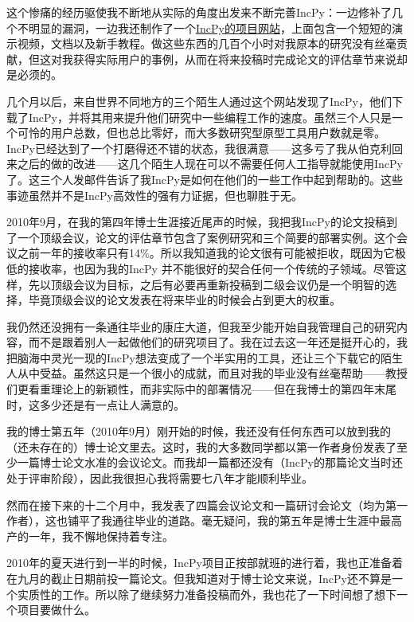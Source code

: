 \documentclass[12pt,UTF8,nofonts]{book}
\begin{document}
\breakline

这个惨痛的经历驱使我不断地从实际的角度出发来不断完善IncPy：一边修补了几个不明显的漏洞，一边我还制作了一个\href{http://www.pgbovine.net/incpy.html}{IncPy的项目网站}，上面包含一个短短的演示视频，文档以及新手教程。做这些东西的几百个小时对我原本的研究没有丝毫贡献，但这对我获得实际用户的事例，从而在将来投稿时完成论文的评估章节来说却是必须的。

几个月以后，来自世界不同地方的三个陌生人通过这个网站发现了IncPy，他们下载了IncPy，并将其用来提升他们研究中一些编程工作的速度。虽然三个人只是一个可怜的用户总数，但也总比零好，而大多数研究型原型工具用户数就是零。IncPy已经达到了一个打磨得还不错的状态，我很满意——这多亏了我从伯克利回来之后的做的改进——这几个陌生人现在可以不需要任何人工指导就能使用IncPy了。这三个人发邮件告诉了我IncPy是如何在他们的一些工作中起到帮助的。这些事迹虽然并不是IncPy高效性的强有力证据，但也聊胜于无。

2010年9月，在我的第四年博士生涯接近尾声的时候，我把我IncPy的论文投稿到了一个顶级会议，论文的评估章节包含了案例研究和三个简要的部署实例。这个会议之前一年的接收率只有14\%。所以我知道我的论文很有可能被拒收，既因为它极低的接收率，也因为我的IncPy 并不能很好的契合任何一个传统的子领域。尽管这样，先以顶级会议为目标，之后有必要再重新投稿到二级会议仍是一个明智的选择，毕竟顶级会议的论文发表在将来毕业的时候会占到更大的权重。

我仍然还没拥有一条通往毕业的康庄大道，但我至少能开始自我管理自己的研究内容，而不是跟着别人一起做他们的研究项目了。我在过去这一年还是挺开心的，我把脑海中灵光一现的IncPy想法变成了一个半实用的工具，还让三个下载它的陌生人从中受益。虽然这只是一个很小的成就，而且对我的毕业没有丝毫帮助——教授们更看重理论上的新颖性，而非实际中的部署情况——但在我博士的第四年末尾时，这多少还是有一点让人满意的。

我的博士第五年（2010年9月）刚开始的时候，我还没有任何东西可以放到我的（还未存在的）博士论文里去。这时，我的大多数同学都以第一作者身份发表了至少一篇博士论文水准的会议论文。而我却一篇都还没有（IncPy的那篇论文当时还处于评审阶段），因此我很担心我将需要七八年才能顺利毕业。

然而在接下来的十二个月中，我发表了四篇会议论文和一篇研讨会论文（均为第一作者），这也铺平了我通往毕业的道路。毫无疑问，我的第五年是博士生涯中最高产的一年，我不懈地保持着专注。

\breakline

2010年的夏天进行到一半的时候，IncPy项目正按部就班的进行着，我也正准备着在九月的截止日期前投一篇论文。但我知道对于博士论文来说，IncPy还不算是一个实质性的工作。所以除了继续努力准备投稿而外，我也花了一下时间想了想下一个项目要做什么。
\end{document}

